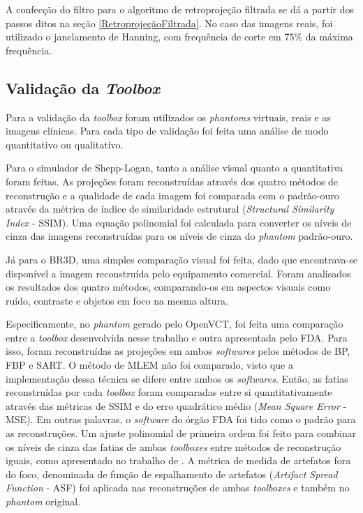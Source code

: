 A confecção do filtro para o algoritmo de retroprojeção filtrada se dá a partir dos passos ditos na seção \ref{RetroprojeçãoFiltrada}. No caso das imagens reais, foi utilizado o janelamento de Hanning, com frequência de corte em 75\% da máxima frequência.

\subsection{Validação da \textit{Toolbox}} 

Para a validação da \textit{toolbox} foram utilizados os \textit{phantoms} virtuais, reais e as imagens clínicas. Para cada tipo de validação foi feita uma análise de modo quantitativo ou qualitativo.

Para o simulador de Shepp-Logan, tanto a análise visual quanto a quantitativa foram feitas. As projeções foram reconstruídas através dos quatro métodos de reconstrução e a qualidade de cada imagem foi comparada com o padrão-ouro através da métrica de índice de similaridade estrutural (\textit{Structural Similarity Index} - \acs{SSIM}). Uma equação polinomial foi calculada para converter os níveis de cinza das imagens reconstruídas para os níveis de cinza do \textit{phantom} padrão-ouro.

Já para o BR3D, uma simples comparação visual foi feita, dado que encontrava-se disponível a imagem reconstruída pelo equipamento comercial. Foram analisados os resultados dos quatro métodos, comparando-os em aspectos visuais como ruído, contraste e objetos em foco na mesma altura. 

Especificamente, no \textit{phantom} gerado pelo OpenVCT, foi feita uma comparação entre a \textit{toolbox} desenvolvida nesse trabalho e outra apresentada pelo \acs{FDA}. Para isso, foram reconstruídas as projeções em ambos \textit{softwares} pelos métodos de \acs{BP}, \acs{FBP} e \acs{SART}. O método de \acs{MLEM} não foi comparado, visto que a implementação dessa técnica se difere entre ambos os \textit{softwares}. Então, as fatias reconstruídas por cada \textit{toolbox} foram comparadas entre si quantitativamente através das métricas de \acs{SSIM} e do erro quadrático médio (\textit{Mean Square Error} - \acs{MSE}). Em outras palavras, o \textit{software} do órgão \acs{FDA} foi tido como o padrão para as reconstruções.  Um ajuste polinomial de primeira ordem foi feito para combinar os níveis de cinza das fatias de ambas \textit{toolboxes} entre métodos de reconstrução iguais, como apresentado no trabalho de . A métrica de medida de artefatos fora do foco, denominada de função de espalhamento de artefatos (\textit{Artifact Spread Function} - \acs{ASF}) foi aplicada nas reconstruções de ambas \textit{toolboxes} e também no \textit{phantom} original.

